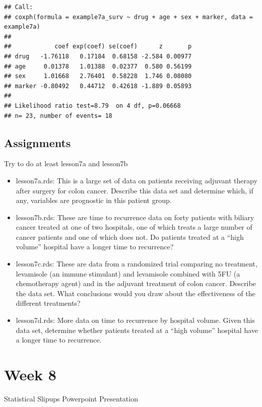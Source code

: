\documentclass[]{book}
\begin{document}
\begin{verbatim}
## Call:
## coxph(formula = example7a_surv ~ drug + age + sex + marker, data = example7a)
## 
##            coef exp(coef) se(coef)      z       p
## drug   -1.76118   0.17184  0.68158 -2.584 0.00977
## age     0.01378   1.01388  0.02377  0.580 0.56199
## sex     1.01668   2.76401  0.58228  1.746 0.08080
## marker -0.80492   0.44712  0.42618 -1.889 0.05893
## 
## Likelihood ratio test=8.79  on 4 df, p=0.06668
## n= 23, number of events= 18
\end{verbatim}

\hypertarget{assignments-6}{%
\section{Assignments}\label{assignments-6}}

Try to do at least lesson7a and lesson7b

\begin{itemize}
\item
  lesson7a.rds: This is a large set of data on patients receiving adjuvant therapy after surgery for colon cancer. Describe this data set and determine which, if any, variables are prognostic in this patient group.
\item
  lesson7b.rds: These are time to recurrence data on forty patients with biliary cancer treated at one of two hospitals, one of which treats a large number of cancer patients and one of which does not. Do patients treated at a ``high volume'' hospital have a longer time to recurrence?
\item
  lesson7c.rds: These are data from a randomized trial comparing no treatment, levamisole (an immune stimulant) and levamisole combined with 5FU (a chemotherapy agent) and in the adjuvant treatment of colon cancer. Describe the data set. What conclusions would you draw about the effectiveness of the different treatments?
\item
  lesson7d.rds: More data on time to recurrence by hospital volume. Given this data set, determine whether patients treated at a ``high volume'' hospital have a longer time to recurrence.
\end{itemize}

\hypertarget{week-8}{%
\chapter{Week 8}\label{week-8}}

Statistical Slipups Powerpoint Presentation
\end{document}
